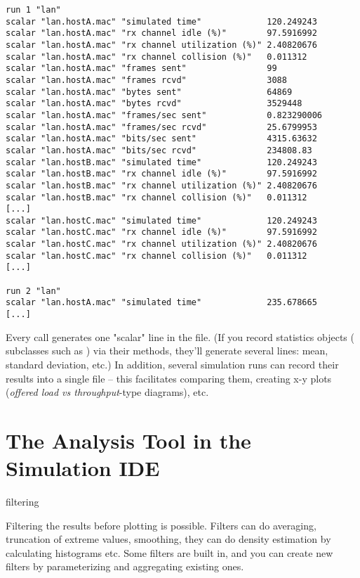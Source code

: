 \begin{verbatim}
run 1 "lan"
scalar "lan.hostA.mac" "simulated time"             120.249243
scalar "lan.hostA.mac" "rx channel idle (%)"        97.5916992
scalar "lan.hostA.mac" "rx channel utilization (%)" 2.40820676
scalar "lan.hostA.mac" "rx channel collision (%)"   0.011312
scalar "lan.hostA.mac" "frames sent"                99
scalar "lan.hostA.mac" "frames rcvd"                3088
scalar "lan.hostA.mac" "bytes sent"                 64869
scalar "lan.hostA.mac" "bytes rcvd"                 3529448
scalar "lan.hostA.mac" "frames/sec sent"            0.823290006
scalar "lan.hostA.mac" "frames/sec rcvd"            25.6799953
scalar "lan.hostA.mac" "bits/sec sent"              4315.63632
scalar "lan.hostA.mac" "bits/sec rcvd"              234808.83
scalar "lan.hostB.mac" "simulated time"             120.249243
scalar "lan.hostB.mac" "rx channel idle (%)"        97.5916992
scalar "lan.hostB.mac" "rx channel utilization (%)" 2.40820676
scalar "lan.hostB.mac" "rx channel collision (%)"   0.011312
[...]
scalar "lan.hostC.mac" "simulated time"             120.249243
scalar "lan.hostC.mac" "rx channel idle (%)"        97.5916992
scalar "lan.hostC.mac" "rx channel utilization (%)" 2.40820676
scalar "lan.hostC.mac" "rx channel collision (%)"   0.011312
[...]

run 2 "lan"
scalar "lan.hostA.mac" "simulated time"             235.678665
[...]
\end{verbatim}

Every  call generates one "scalar" line in the file.
(If you record statistics objects ( subclasses
such as ) via their  methods,
they'll generate several lines: mean, standard deviation, etc.)
In addition, several simulation runs can record their results into a single file --
this facilitates comparing them, creating x-y plots
(\textit{offered load vs throughput}-type diagrams), etc.



\section{The Analysis Tool in the Simulation IDE}

filtering

Filtering the results before plotting is
possible. Filters can do averaging, truncation of extreme values,
smoothing, they can do density estimation by
calculating histograms etc. Some filters are built
in, and you can create new filters by parameterizing and aggregating
existing ones.

